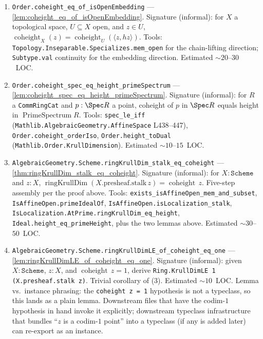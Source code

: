 \begin{enumerate}
  \item \texttt{Order.coheight\_eq\_of\_isOpenEmbedding} ---
    \cref{lem:coheight_eq_of_isOpenEmbedding}. Signature (informal): for
    \(X\) a topological space, \(U \subseteq X\) open, and \(z \in U\),
    \(\operatorname{coheight}_{X}(z) = \operatorname{coheight}_{U}(\langle z, hz\rangle)\).
    Tools: \texttt{Topology.Inseparable.Specializes.mem\_open} for the
    chain-lifting direction; \texttt{Subtype.val} continuity for the
    embedding direction. Estimated \(\sim 20\)--\(30\)~LOC.
  \item \texttt{Order.coheight\_spec\_eq\_height\_primeSpectrum} ---
    \cref{lem:coheight_spec_eq_height_primeSpectrum}. Signature (informal):
    for \(R\) a \texttt{CommRingCat} and \(p : \Spec R\) a point, coheight of \(p\)
    in \(\Spec R\) equals height in \(\operatorname{PrimeSpectrum} R\). Tools:
    \texttt{spec\_le\_iff} (\texttt{Mathlib.AlgebraicGeometry.AffineSpace} L438--447),
    \texttt{Order.coheight\_orderIso}, \texttt{Order.height\_toDual}
    (\texttt{Mathlib.Order.KrullDimension}). Estimated \(\sim 10\)--\(15\)~LOC.
  \item \texttt{AlgebraicGeometry.Scheme.ringKrullDim\_stalk\_eq\_coheight} ---
    \cref{thm:ringKrullDim_stalk_eq_coheight}. Signature (informal): for
    \(X : \texttt{Scheme}\) and \(z : X\),
    \(\operatorname{ringKrullDim}(X.\text{presheaf.stalk}\,z) =
    \operatorname{coheight}\,z\). Five-step assembly per the proof above.
    Tools: \texttt{exists\_isAffineOpen\_mem\_and\_subset},
    \texttt{IsAffineOpen.primeIdealOf}, \texttt{IsAffineOpen.isLocalization\_stalk},
    \texttt{IsLocalization.AtPrime.ringKrullDim\_eq\_height},
    \texttt{Ideal.height\_eq\_primeHeight}, plus the two lemmas above.
    Estimated \(\sim 30\)--\(50\)~LOC.
  \item \texttt{AlgebraicGeometry.Scheme.ringKrullDimLE\_of\_coheight\_eq\_one} ---
    \cref{lem:ringKrullDimLE_of_coheight_eq_one}. Signature (informal):
    given \(X : \texttt{Scheme}\), \(z : X\), and \(\operatorname{coheight}\,z = 1\),
    derive \texttt{Ring.KrullDimLE 1 (X.presheaf.stalk z)}. Trivial corollary
    of (3). Estimated \(\sim 10\)~LOC. Lemma vs.\ instance phrasing: the
    \texttt{coheight\,z = 1} hypothesis is not a typeclass, so this lands as
    a plain lemma. Downstream files that have the codim-\(1\) hypothesis in
    hand invoke it explicitly; downstream typeclass infrastructure that
    bundles ``\(z\) is a codim-\(1\) point'' into a typeclass (if any is added
    later) can re-export as an instance.
\end{enumerate}

